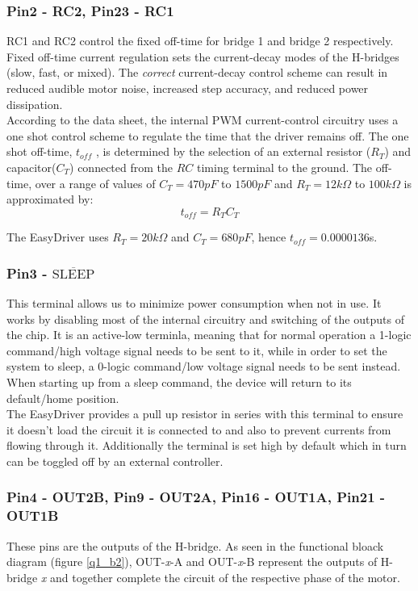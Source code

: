 \documentclass{article}
\theoremstyle{plain}
\theoremstyle{definition}
\theoremstyle{remark}
\begin{document}
\subsubsection*{Pin2 - RC2, Pin23 - RC1}
RC1 and RC2 control the fixed off-time for bridge 1 and bridge 2 respectively. Fixed off-time current regulation sets the current-decay modes of the H-bridges (slow, fast, or mixed).  The \emph{correct} current-decay control scheme can result in reduced audible motor noise, increased step accuracy, and reduced power dissipation.\\

According to the data sheet, the internal PWM current-control circuitry uses a one shot control scheme to regulate the time that the driver remains off.  The one shot off-time, $t_{off}$ , is determined by the selection of an external resistor ($R_T$) and capacitor($C_T$) connected from the $RC$ timing terminal to the ground. The off-time, over a range of values of $C_T = 470 pF$ to $1500 pF$ and $R_T = 12 k\Omega$ to $100 k\Omega$ is approximated by:
$$t_{off} = R_T C_T$$

The EasyDriver uses $R_T = 20k\Omega$ and $C_T = 680 pF$, hence $t_{off} = 0.0000136$s.\\

\subsubsection*{Pin3 - $\overline{\text{SLEEP}}$}
This terminal allows us to minimize power consumption when not in use. It works by disabling most of the internal circuitry and switching of the outputs of the chip. It is an active-low terminla, meaning that for normal operation a 1-logic command/high voltage signal needs to be sent to it, while in order to set the system to sleep, a 0-logic command/low voltage signal needs to be sent instead. When starting up from a sleep command, the device will return to its default/home position.\\

The EasyDriver provides a pull up resistor in series with this terminal to ensure it doesn't load the circuit it is connected to and also to prevent currents from flowing through it. Additionally the terminal is set high by default which in turn can be toggled off by an external controller.


\subsubsection*{Pin4 - OUT2B, Pin9 - OUT2A, Pin16 - OUT1A, Pin21 - OUT1B}
These pins are the outputs of the H-bridge. As seen in the functional bloack diagram (figure \ref{q1_b2}), OUT-\emph{x}-A and OUT-\emph{x}-B represent the outputs of H-bridge \emph{x} and together complete the circuit of the respective phase of the motor.\\
\end{document}

